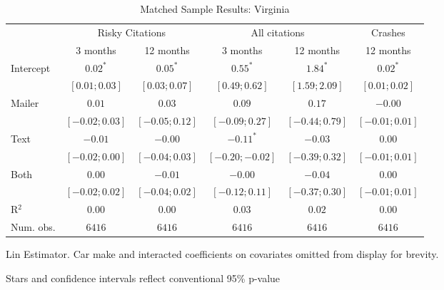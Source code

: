 
\begin{table}
\caption{Matched Sample Results: Virginia}
\begin{center}
\begin{threeparttable}
\begin{tabular}{l c c c c c}
\hline
 & \multicolumn{2}{c}{Risky Citations} & \multicolumn{2}{c}{All citations} & \multicolumn{1}{c}{Crashes} \\
\cline{2-3} \cline{4-5} \cline{6-6}
 & 3 months & 12 months & 3 months & 12 months & 12 months \\
\hline
Intercept & $0.02^{*}$       & $0.05^{*}$       & $0.55^{*}$        & $1.84^{*}$       & $0.02^{*}$       \\
          & $ [ 0.01; 0.03]$ & $ [ 0.03; 0.07]$ & $ [ 0.49;  0.62]$ & $ [ 1.59; 2.09]$ & $ [ 0.01; 0.02]$ \\
Mailer    & $0.01$           & $0.03$           & $0.09$            & $0.17$           & $-0.00$          \\
          & $ [-0.02; 0.03]$ & $ [-0.05; 0.12]$ & $ [-0.09;  0.27]$ & $ [-0.44; 0.79]$ & $ [-0.01; 0.01]$ \\
Text      & $-0.01$          & $-0.00$          & $-0.11^{*}$       & $-0.03$          & $0.00$           \\
          & $ [-0.02; 0.00]$ & $ [-0.04; 0.03]$ & $ [-0.20; -0.02]$ & $ [-0.39; 0.32]$ & $ [-0.01; 0.01]$ \\
Both      & $0.00$           & $-0.01$          & $-0.00$           & $-0.04$          & $0.00$           \\
          & $ [-0.02; 0.02]$ & $ [-0.04; 0.02]$ & $ [-0.12;  0.11]$ & $ [-0.37; 0.30]$ & $ [-0.01; 0.01]$ \\
\hline
R$^2$     & $0.00$           & $0.00$           & $0.03$            & $0.02$           & $0.00$           \\
Num. obs. & $6416$           & $6416$           & $6416$            & $6416$           & $6416$           \\
\hline
\end{tabular}
\begin{tablenotes}[flushleft]
\scriptsize{\item Lin Estimator. Car make and interacted coefficients on covariates omitted from display for brevity.
                             \item Stars and confidence intervals reflect conventional 95\% p-value}
\end{tablenotes}
\end{threeparttable}
\label{table:coefficients}
\end{center}
\end{table}
